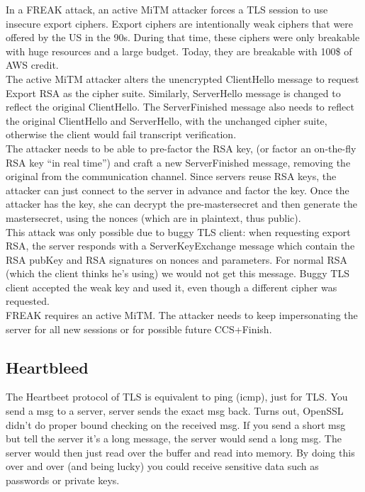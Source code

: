 \documentclass[11pt,oneside,a4paper]{article}
\begin{document}
In a FREAK attack, an active MiTM attacker forces a TLS session to use insecure export ciphers. Export ciphers are intentionally weak ciphers that were offered by the US in the 90s. During that time, these ciphers were only breakable with huge resources and a large budget. Today, they are breakable with 100\$ of AWS credit.\\
The active MiTM attacker alters the unencrypted ClientHello message to request Export RSA as the
cipher suite. Similarly, ServerHello message is changed to reflect the original ClientHello. The ServerFinished message also needs to reflect the original ClientHello and ServerHello, with the unchanged cipher suite, otherwise the client would fail transcript verification.\\
The attacker needs to be able to pre-factor the RSA key, (or factor an on-the-fly RSA key “in real time”) and craft a new ServerFinished message, removing the original from the communication channel. Since servers reuse RSA keys, the attacker can just connect to the server in advance and factor the key. Once the attacker has the key, she can decrypt the pre-mastersecret and then generate the mastersecret, using the nonces (which are in plaintext, thus public).\\
This attack was only possible due to buggy TLS client: when requesting export RSA, the server responds with a ServerKeyExchange message which contain the RSA pubKey and RSA signatures on nonces and parameters. For normal RSA (which the client thinks he's using) we would not get this message. Buggy TLS client accepted the weak key and used it, even though a different cipher was requested.\\
FREAK requires an active MiTM. The attacker needs to keep impersonating the server for all new sessions or for possible future CCS+Finish.

\subsection{Heartbleed}

The Heartbeet protocol of TLS is equivalent to ping (icmp), just for TLS. You send a msg to a server, server sends the exact msg back. Turns out, OpenSSL didn't do proper bound checking on the received msg. If you send a short msg but tell the server it's a long message, the server would send a long msg. The server would then just read over the buffer and read into memory. By doing this over and over (and being lucky) you could receive sensitive data such as passwords or private keys.
\end{document}
